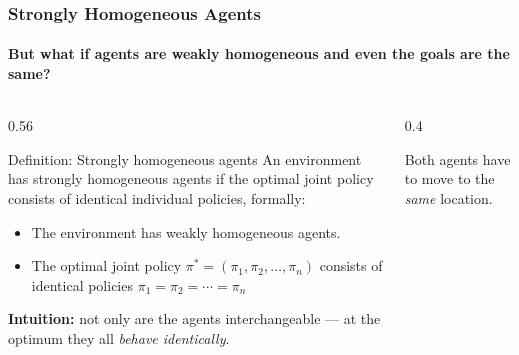 \begin{frame}
\frametitle{Strongly Homogeneous Agents}
\framesubtitle{But what if agents are weakly homogeneous and even the goals are the same?}

\begin{columns}[T,onlytextwidth]

\begin{column}{0.56\textwidth}
\begin{block}{Definition: Strongly homogeneous agents}
\small
An environment has strongly homogeneous agents if the optimal joint policy
consists of identical individual policies, formally:
\begin{itemize}
    \item The environment has weakly homogeneous agents.
    \item The optimal joint policy
    $\pi^{*} = (\pi_1, \pi_2, \ldots, \pi_n)$
    consists of identical policies
    \colorbox{blue!20}{$\pi_1 = \pi_2 = \cdots = \pi_n$}
\end{itemize}
\end{block}

\vspace{0.3em}
{\small
\textbf{Intuition:} not only are the agents interchangeable --- at the
optimum they all \emph{behave identically}.
}
\end{column}

\begin{column}{0.4\textwidth}
\centering
\vspace{0.3em}

\vspace{0.2em}
{\small Both agents have to move to the \emph{same} location.}
\end{column}

\end{columns}

\end{frame}

